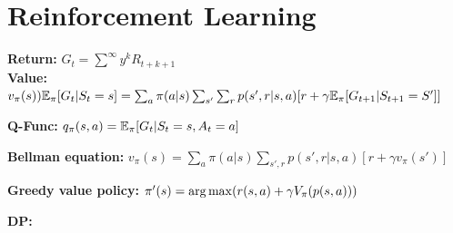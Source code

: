 \section{Reinforcement Learning}

\textbf{Return:} $G_t = \sum^\infty y^k R_{t+k+1}$\\
\textbf{Value:} $v_\pi(s) ) \mathbb{E}_\pi[G_t | S_t = s] = \sum_a \pi(a|s) \sum_{s'} \sum_r p(s', r| s,a)[r + \gamma \mathbb{E}_\pi[G_{t+1} | S_{t+1} = S']]$\\

\textbf{Q-Func:} $q_\pi(s, a) = \mathbb{E}_\pi[G_t | S_t = s, A_t = a]$\\

\textbf{Bellman equation:} $v_\pi(s) = \sum_a \pi(a|s) \sum_{s', r} p(s', r| s,a)[r + \gamma v_\pi(s')]$\\

\textbf{Greedy value policy:} $\pi'(s) = \operatorname*{arg\,max}(r(s,a) + \gamma V_\pi(p(s,a)))$\\

\textbf{DP:}\\

